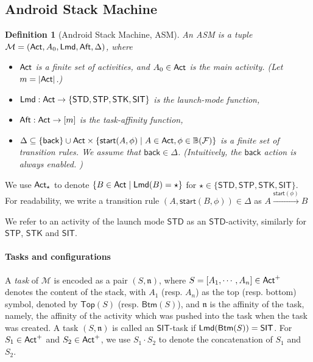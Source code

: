 \documentclass[preprint,12pt]{elsarticle}
\newtheorem{definition}{Definition}
\newcommand\Mm{{\mathcal{M} }}
\newcommand\Nn{{\mathbb{N} }}
\newcommand\act{{\sf Act}}
\newcommand\aft{{\sf Aft}}
\newcommand\lmd{{\sf Lmd}}
\newcommand\standard{{\sf STD}}
\newcommand\singletop{{\sf STP}}
\newcommand\singletask{{\sf STK}}
\newcommand\singleinstance{{\sf SIT}}
\newcommand{\AMASS}{\textsf{ASM}}
\newcommand\flagset{\mathcal{F}}
\newcommand\bool{\mathbb{B}}
\newcommand\back{{\mathsf{back} }}
\newcommand\startactivity{{\mathsf{start} }}
\newcommand\aname{\mathfrak{n}}
\newcommand{\STK}{\mathsf{STK}}
\newcommand{\SIT}{\mathsf{SIT}}
\newcommand{\STD}{\mathsf{STD}}
\newcommand{\STP}{\mathsf{STP}}
\newcommand\topact{\mathsf{Top}}
\newcommand\btmact{\mathsf{Btm}}
\begin{document}
\subsection{Android Stack Machine}


\begin{definition}[Android Stack Machine, \AMASS] \label{def:afsm}
An {\AMASS} is a tuple $\Mm = (\act, A_0, \lmd, \aft, \Delta)$, where 
\begin{itemize}
\item $\act$ is a finite set of activities, and $A_0 \in \act$ is the main activity. (Let $m=|\act|$.)
\item $\lmd : \act \rightarrow \{\standard,\singletop,\singletask,\singleinstance\}$ is the launch-mode function,
%
\item $\aft : \act \rightarrow [m]$ is the task-affinity function, 
%
\item $\Delta \subseteq \{\back\} \cup \act \times \{\startactivity(A,\phi)\mid A \in \act, \phi \in \bool(\flagset)\}$ is a finite set of transition rules. We assume that $\back \in \Delta$.  (Intuitively, the $\back$ action is always enabled. )
\end{itemize}
%
\end{definition}
We use $\act_{\star}$ to denote $\{B\in\act\mid \lmd(B)= \star\}$ for $\star\in\{\STD,\STP,\STK,\SIT\}$.
For readability, we write a transition rule $(A, \startactivity(B, \phi))\in \Delta$ as $A \xrightarrow{\startactivity(\phi)} B$


We refer to an activity of the launch mode $\STD$ as an $\STD$-activity, similarly for $\STP$, $\STK$ and $\SIT$. 



\paragraph{Tasks and configurations} A \emph{task} of $\Mm$ is encoded as a pair $(S, \aname)$, where $S= [A_1, \cdots, A_n] \in \act^+$ denotes the content of the stack, with $A_1$ (resp. $A_n$) as  the top (resp. bottom) symbol, denoted by $\topact(S)$ (resp. $\btmact(S)$), and $\aname$ is the affinity of the task, namely, the affinity of the activity which was pushed into the task when the task was created. A task $(S, \aname)$ is called an $\SIT$-task if $\lmd(\btmact(S)) = \SIT$.
For $S_1 \in \act^+$ and $S_2 \in \act^+$, we use $S_1 \cdot S_2$ to denote the concatenation of $S_1$ and $S_2$.
\end{document}
